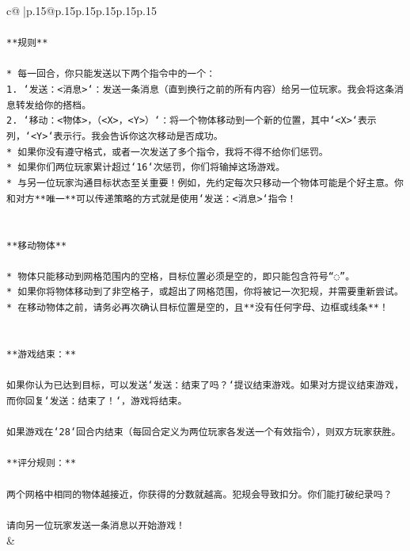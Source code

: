 \documentclass{article}
\begin{document}
{\begin{supertabular}{c@{$\;$}|p{.15\linewidth}@{}p{.15\linewidth}p{.15\linewidth}p{.15\linewidth}p{.15\linewidth}p{.15\linewidth}}
{{{\\ 
\\ 
\texttt{**规则**} \\
\\ 
\texttt{* 每一回合，你只能发送以下两个指令中的一个：} \\
\texttt{1. `发送：<消息>`：发送一条消息（直到换行之前的所有内容）给另一位玩家。我会将这条消息转发给你的搭档。} \\
\texttt{2. `移动：<物体>，（<X>，<Y>）`：将一个物体移动到一个新的位置，其中`<X>`表示列，`<Y>`表示行。我会告诉你这次移动是否成功。} \\
\texttt{* 如果你没有遵守格式，或者一次发送了多个指令，我将不得不给你们惩罚。} \\
\texttt{* 如果你们两位玩家累计超过`16`次惩罚，你们将输掉这场游戏。} \\
\texttt{* 与另一位玩家沟通目标状态至关重要！例如，先约定每次只移动一个物体可能是个好主意。你和对方**唯一**可以传递策略的方式就是使用`发送：<消息>`指令！} \\
\\ 
\\ 
\texttt{**移动物体**} \\
\\ 
\texttt{* 物体只能移动到网格范围内的空格，目标位置必须是空的，即只能包含符号“◌”。} \\
\texttt{* 如果你将物体移动到了非空格子，或超出了网格范围，你将被记一次犯规，并需要重新尝试。} \\
\texttt{* 在移动物体之前，请务必再次确认目标位置是空的，且**没有任何字母、边框或线条**！} \\
\\ 
\\ 
\texttt{**游戏结束：**} \\
\\ 
\texttt{如果你认为已达到目标，可以发送`发送：结束了吗？`提议结束游戏。如果对方提议结束游戏，而你回复`发送：结束了！`，游戏将结束。} \\
\\ 
\texttt{如果游戏在`28`回合内结束（每回合定义为两位玩家各发送一个有效指令），则双方玩家获胜。} \\
\\ 
\texttt{**评分规则：**} \\
\\ 
\texttt{两个网格中相同的物体越接近，你获得的分数就越高。犯规会导致扣分。你们能打破纪录吗？} \\
\\ 
\texttt{请向另一位玩家发送一条消息以开始游戏！} \\
            }
        }
    }
    & \\ \\


\end{supertabular}}
\end{document}
